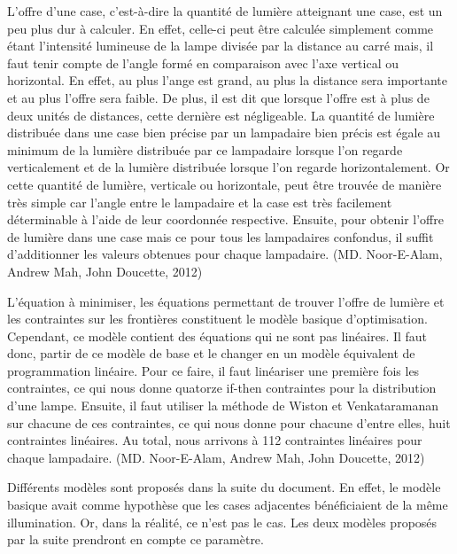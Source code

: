 \bigskip

L'offre d'une case, c'est-à-dire la quantité de lumière atteignant une case, est un peu plus dur à calculer. En effet, celle-ci peut être calculée simplement comme étant l'intensité lumineuse de la lampe divisée par la distance au carré mais, il faut tenir compte de l'angle formé en comparaison avec l'axe vertical ou horizontal. En effet, au plus l'ange est grand, au plus la distance sera importante et au plus l'offre sera faible. De plus, il est dit que lorsque l'offre est à plus de deux unités de distances, cette dernière est négligeable.
La quantité de lumière distribuée dans une case bien précise par un lampadaire bien précis est égale au minimum de la lumière distribuée par ce lampadaire lorsque l'on regarde verticalement et de la lumière distribuée lorsque l'on regarde horizontalement. Or cette quantité de lumière, verticale ou horizontale, peut être trouvée de manière très simple car l'angle entre le lampadaire et la case est très facilement déterminable à l'aide de leur coordonnée respective.
Ensuite, pour obtenir l'offre de lumière dans une case mais ce pour tous les lampadaires confondus, il suffit d'additionner les valeurs obtenues pour chaque lampadaire. (MD. Noor-E-Alam, Andrew Mah, John Doucette, 2012)

\bigskip

L'équation à minimiser, les équations permettant de trouver l'offre de lumière et les contraintes sur les frontières constituent le modèle basique d'optimisation. Cependant, ce modèle contient des équations qui ne sont pas linéaires. Il faut donc, partir de ce modèle de base et le changer en un modèle équivalent de programmation linéaire. Pour ce faire, il faut linéariser une première fois les contraintes, ce qui nous donne quatorze if-then contraintes pour la distribution d'une lampe. Ensuite, il faut utiliser la méthode de Wiston et Venkataramanan sur chacune de ces contraintes, ce qui nous donne pour chacune d'entre elles, huit contraintes linéaires. Au total, nous arrivons à 112 contraintes linéaires pour chaque lampadaire. (MD. Noor-E-Alam, Andrew Mah, John Doucette, 2012)

\bigskip

Différents modèles sont proposés dans la suite du document. En effet, le modèle basique avait comme hypothèse que les cases adjacentes bénéficiaient de la même illumination. Or, dans la réalité, ce n'est pas le cas. Les deux modèles proposés par la suite prendront en compte ce paramètre. 

\bigskip

